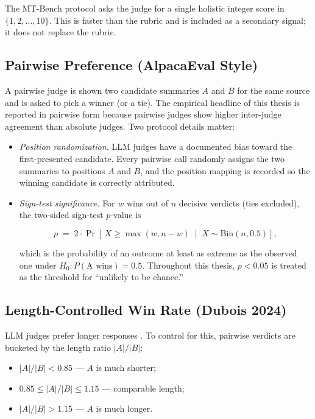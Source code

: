 The MT-Bench protocol \cite{Zheng2023} asks the judge for a single
holistic integer score in $\{1,2,\ldots,10\}$. This is faster than the
rubric and is included as a secondary signal; it does not replace the
rubric.

\subsection{Pairwise Preference (AlpacaEval Style)}

A pairwise judge is shown two candidate summaries $A$ and $B$ for the same
source and is asked to pick a winner (or a tie). The empirical headline of
this thesis is reported in pairwise form because pairwise judges show
higher inter-judge agreement than absolute judges. Two protocol details
matter:

\begin{itemize}
  \item \textit{Position randomization.} LLM judges have a documented bias
        toward the first-presented candidate. Every pairwise call randomly
        assigns the two summaries to positions $A$ and $B$, and the
        position mapping is recorded so the winning candidate is correctly
        attributed.
  \item \textit{Sign-test significance.} For $w$ wins out of $n$ decisive
        verdicts (ties excluded), the two-sided sign-test $p$-value is

        \[
        p \;=\; 2 \cdot \Pr\!\left[\,X \geq \max(w, n - w) \;\mid\; X \sim \text{Bin}(n, 0.5)\right],
        \]

        \noindent which is the probability of an outcome at least as
        extreme as the observed one under $H_0: P(\text{A wins}) = 0.5$.
        Throughout this thesis, $p < 0.05$ is treated as the threshold
        for ``unlikely to be chance.''
\end{itemize}

\subsection{Length-Controlled Win Rate (Dubois 2024)}

LLM judges prefer longer responses \cite{Dubois2024}. To control for this,
pairwise verdicts are bucketed by the length ratio $|A|/|B|$:

\begin{itemize}
  \item $|A|/|B| < 0.85$ --- $A$ is much shorter;
  \item $0.85 \leq |A|/|B| \leq 1.15$ --- comparable length;
  \item $|A|/|B| > 1.15$ --- $A$ is much longer.
\end{itemize}

